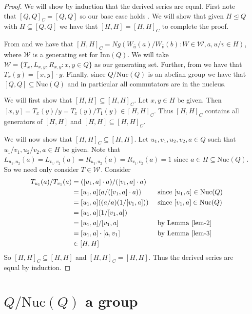 \documentclass[12pt, twoside, openright]{report}
\theoremstyle{definition}
\newcommand{\rdv}{/}                %
\newcommand{\nuc}{\text{Nuc}}       %
\newcommand{\inn}{\text{Inn}}       %
\begin{document}
\begin{proof}
  We will show by induction that the derived series are equal. First note that $[Q, Q]_C = [Q, Q]$
    so our base case holds \cite{ComTheory}. We will show that given $H\unlhd Q$ with
    $H\subseteq [Q, Q]$ we have that $[H, H] = [H, H]_C$ to complete the proof.

  From \cite{ComTheory} and \cite{BK-inner} we have that
    $[H, H]_C = Ng(W_{\bar{u}}(a)/W_{\bar{v}}(b) : W\in\mathcal{W}, a, u/v\in H)$, where
    $\mathcal{W}$ is a generating set for $\inn(Q)$. We will take
    $\mathcal{W} = \{T_x, L_{x, y}, R_{x, y} : x, y\in Q\}$ as our generating set. Further,
    from \cite{PACC} we have that $T_x(y) = [x, y]\cdot y$. Finally, since $Q\rdv\nuc(Q)$ is
    an abelian group we have that $[Q, Q]\subseteq \nuc(Q)$ and in particular all
    commutators are in the nucleus.

  We will first show that $[H, H]\subseteq [H, H]_C$. Let $x, y\in H$ be given. Then
    $[x, y] = T_x(y)\rdv y = T_x(y)\rdv T_1(y) \in [H, H]_C$. Thus $[H, H]_C$ contains
    all generators of $[H, H]$ and $[H, H]\subseteq [H, H]_C$.

  We will now show that $[H, H]_C\subseteq [H, H]$. Let $u_1, v_1, u_2, v_2, a\in Q$
    such that $u_1\rdv v_1, u_2\rdv v_2, a\in H$ be given. Note that
    $L_{u_1, u_2}(a) = L_{v_1, v_2}(a) = R_{u_1, u_2}(a) = R_{v_1, v_2}(a) = 1$ since
    $a\in H\subseteq \nuc(Q)$. So we need only consider $T\in\mathcal{W}$. Consider
  \begin{alignat*}{2}
    T_{u_1}(a)\rdv T_{v_1}(a) &= ([u_1, a]\cdot a)\rdv ([v_1, a]\cdot a) &&\\
    &= [u_1, a](a\rdv([v_1, a]\cdot a)) &&\text{ since $[u_1, a]\in\nuc(Q)$}\\
    &= [u_1, a]((a\rdv a)(1\rdv[v_1, a])) &&\text{ since $[v_1, a]\in\nuc(Q)$}\\
    &= [u_1, a](1\rdv [v_1, a]) &&\\
    &= [u_1, a]\rdv [v_1, a] &&\text{ by Lemma \ref{lem-2}}\\
    &= [u_1, a]\cdot [a, v_1] &&\text{ by Lemma \ref{lem-3}}\\
    &\in [H, H]
  \end{alignat*}
  So $[H, H]_C\subseteq [H, H]$ and $[H, H]_C = [H, H]$. Thus the derived series are equal by induction.
\end{proof}

\section{$Q/\nuc(Q)$ a group}
\label{sec:innMappings}
\end{document}
